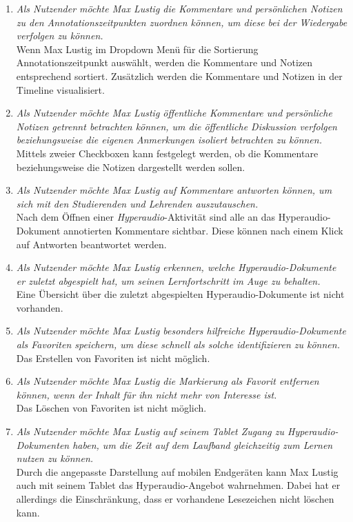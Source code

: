 \begin{enumerate}[label=US-\arabic*:,ref=US-\arabic*]
\item \label{US-Sortierung-Zeitpunkt} \textit{Als Nutzender möchte Max Lustig die Kommentare und persönlichen Notizen zu den Annotationszeitpunkten zuordnen können, um diese bei der Wiedergabe verfolgen zu können.}\\
Wenn Max Lustig im Dropdown Menü für die Sortierung \glqq Annotationszeitpunkt\grqq{} auswählt, werden die Kommentare und Notizen entsprechend sortiert. Zusätzlich werden die Kommentare und Notizen in der Timeline visualisiert.

\item \label{US-Filter} \textit{Als Nutzender möchte Max Lustig öffentliche Kommentare und persönliche Notizen getrennt betrachten können, um die öffentliche Diskussion verfolgen beziehungsweise die eigenen Anmerkungen isoliert betrachten zu können.}\\
Mittels zweier Checkboxen kann festgelegt werden, ob die Kommentare beziehungsweise die Notizen dargestellt werden sollen.

\item \label{US-Antwort-S} \textit{Als Nutzender möchte Max Lustig auf Kommentare antworten können, um sich mit den Studierenden und Lehrenden auszutauschen.}\\
Nach dem Öffnen einer \textit{Hyperaudio}-Aktivität sind alle an das Hyperaudio-Dokument annotierten Kommentare sichtbar. Diese können nach einem Klick auf \glqq Antworten\grqq{} beantwortet werden.

\item \label{US-Uebersicht-Letzte} \textit{Als Nutzender möchte Max Lustig erkennen, welche Hyperaudio-Dokumente er zuletzt abgespielt hat, um seinen Lernfortschritt im Auge zu behalten.}\\
Eine Übersicht über die zuletzt abgespielten Hyperaudio-Dokumente ist nicht vorhanden.

\item \label{US-Favoriten} \textit{Als Nutzender möchte Max Lustig besonders hilfreiche Hyperaudio-Dokumente als Favoriten speichern, um diese schnell als solche identifizieren zu können.}\\
Das Erstellen von Favoriten ist nicht möglich.

\item \label{US-Favoriten-Loeschen} \textit{Als Nutzender möchte Max Lustig die Markierung als Favorit entfernen können, wenn der Inhalt für ihn nicht mehr von Interesse ist.}\\
Das Löschen von Favoriten ist nicht möglich.

\item \label{US-Zeit-Mobil} \textit{Als Nutzender möchte Max Lustig auf seinem Tablet Zugang zu Hyperaudio-Dokumenten haben, um die Zeit auf dem Laufband gleichzeitig zum Lernen nutzen zu können.}\\
Durch die angepasste Darstellung auf mobilen Endgeräten kann Max Lustig auch mit seinem Tablet das Hyperaudio-Angebot wahrnehmen. Dabei hat er allerdings die Einschränkung, dass er vorhandene Lesezeichen nicht löschen kann.
\end{enumerate}

